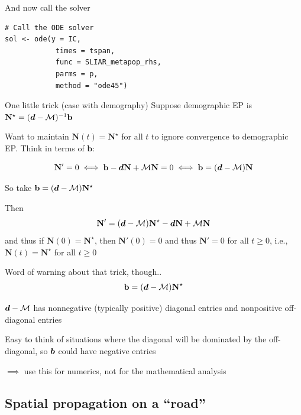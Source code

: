 \documentclass[aspectratio=169]{beamer}\usepackage[]{graphicx}\usepackage[]{xcolor}
\begin{document}
\begin{frame}[fragile]{And now call the solver}
\begin{lstlisting}
# Call the ODE solver
sol <- ode(y = IC, 
			times = tspan, 
			func = SLIAR_metapop_rhs, 
			parms = p,
			method = "ode45")
\end{lstlisting}	
\end{frame}
	
\begin{frame}[fragile]{One little trick (case with demography)}
	Suppose demographic EP is $\mathbf{N}^\star=(\bm{d}-\mathcal{M})^{-1}\mathbf{b}$

	Want to maintain $\mathbf{N}(t)=\mathbf{N}^\star$ for all $t$ to ignore convergence to demographic EP. Think in terms of $\mathbf{b}$:
	
	$$
	\mathbf{N}'=0\iff \mathbf{b}-\bm{d}\mathbf{N}+\mathcal{M}\mathbf{N}=0 \iff \mathbf{b} = (\bm{d}-\mathcal{M})\mathbf{N}
	$$
	
	So take $\mathbf{b}=(\bm{d}-\mathcal{M})\mathbf{N}^\star$
	
	Then
	$$
	\mathbf{N}' = (\bm{d}-\mathcal{M})\mathbf{N}^\star
	-\bm{d}\mathbf{N}+\mathcal{M}\mathbf{N}
	$$
	and thus if $\mathbf{N}(0)=\mathbf{N}^\star$, then $\mathbf{N}'(0)=0$ and thus $\mathbf{N}'=0$ for all $t\geq 0$, i.e., $\mathbf{N}(t)=\mathbf{N}^\star$ for all $t\geq 0$
\end{frame}

\begin{frame}{Word of warning about that trick, though..}
$$
\mathbf{b}=(\bm{d}-\mathcal{M})\mathbf{N}^\star
$$
	
$\bm{d}-\mathcal{M}$ has nonnegative (typically positive) diagonal entries and nonpositive off-diagonal entries
	
Easy to think of situations where the diagonal will be dominated by the off-diagonal, so $\bm{b}$ could have negative entries
	
$\implies$ use this for numerics, not for the mathematical analysis
\end{frame}



\subsection{Spatial propagation on a ``road''}

\end{document}
